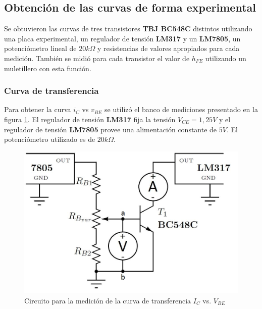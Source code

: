 \documentclass[10pt,spanish,a4paper,openany,notitlepage]{article}
\begin{document}
\subsection{Obtención de las curvas de forma experimental}

Se obtuvieron las curvas de tres transistores \textbf{TBJ BC548C} distintos utilizando una placa experimental, un regulador de tensión \textbf{LM317} y un \textbf{LM7805}, un potenciómetro lineal de $20\unit{k\Omega}$ y resistencias de valores apropiados para cada medición.
También se midió para cada transistor el valor de $h_{FE}$ utilizando un muletillero con esta función.

\subsubsection{Curva de transferencia}

Para obtener la curva $i_C$ vs $v_{BE}$ se utilizó el banco de mediciones presentado en la figura \ref{circuito:medicion_transferencia}. El regulador de tensión \textbf{LM317} fija la tensión $V_{CE}=1,25\unit{V}$ y el regulador de tensión \textbf{LM7805} provee una alimentación constante de $5\unit{V}$. El potenciómetro utilizado es de $20 \unit{k\Omega}$.

\begin{figure}[H] %
\begin{center}
\includegraphics[scale=0.3]{./imagenes/ic_vbe.jpg}
\caption{Circuito para la medición de la curva de transferencia $I_C$ vs. $V_{BE}$}
 \label{circuito:medicion_transferencia}
\end{center}
\end{figure}
\end{document}
